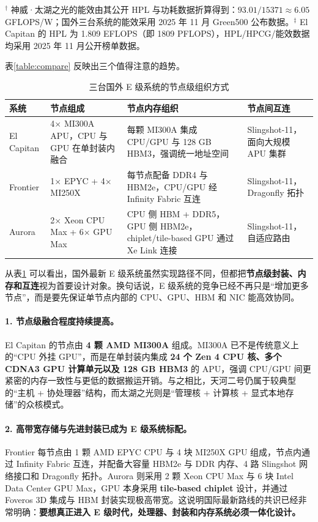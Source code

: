 \documentclass[a4paper]{article}
\begin{document}
\noindent\footnotesize{$^\dagger$ 神威·太湖之光的能效由其公开 HPL 与功耗数据折算得到：$93.01/15371 \approx 6.05$ GFLOPS/W；国外三台系统的能效采用 2025 年 11 月 Green500 公布数据。$^{\ddagger}$ El Capitan 的 HPL 为 1.809 EFLOPS（即 1809 PFLOPS），HPL/HPCG/能效数据均采用 2025 年 11 月公开榜单数据。}\normalsize

表\ref{table:compare} 反映出三个值得注意的趋势。

\begin{table}[htbp]
  \centering
  \footnotesize
  \begin{tabular}{p{1.8cm}p{3.7cm}p{3.4cm}p{3.2cm}}
  \toprule
  系统 & 节点组成 & 节点内存组织 & 节点间互连 \\
  \midrule
  El Capitan & 4$\times$ MI300A APU，CPU 与 GPU 在单封装内融合 & 每颗 MI300A 集成 CPU/GPU 与 128 GB HBM3，强调统一地址空间 & Slingshot-11，面向大规模 APU 集群 \\
  Frontier & 1$\times$ EPYC + 4$\times$ MI250X & 每节点配备 DDR4 与 HBM2e，CPU/GPU 经 Infinity Fabric 互连 & Slingshot-11，Dragonfly 拓扑 \\
  Aurora & 2$\times$ Xeon CPU Max + 6$\times$ GPU Max & CPU 侧 HBM + DDR5，GPU 侧 HBM2e，chiplet/tile-based GPU 通过 Xe Link 连接 & Slingshot-11，自适应路由 \\
  \bottomrule
  \end{tabular}
  \caption{三台国外 E 级系统的节点级组织方式}
  \label{table:foreign_nodes}
\end{table}

从表\ref{table:foreign_nodes} 可以看出，国外最新 E 级系统虽然实现路径不同，但都把\textbf{节点级封装、内存和互连}视为首要设计对象。换句话说，E 级系统的竞争已经不再只是“增加更多节点”，而是要先保证单节点内部的 CPU、GPU、HBM 和 NIC 能高效协同。

\paragraph{1. 节点级融合程度持续提高。}
El Capitan 的节点由 \textbf{4 颗 AMD MI300A} 组成。MI300A 已不是传统意义上的“CPU 外挂 GPU”，而是在单封装内集成 \textbf{24 个 Zen 4 CPU 核、多个 CDNA3 GPU 计算单元以及 128 GB HBM3} 的 APU，强调 CPU/GPU 间更紧密的内存一致性与更低的数据搬运开销\cite{elcapitan_hw_2025}。与之相比，天河二号仍属于较典型的“主机 + 协处理器”结构，而太湖之光则是“管理核 + 计算核 + 显式本地存储”的众核模式。

\paragraph{2. 高带宽存储与先进封装已成为 E 级系统标配。}
Frontier 每节点由 1 颗 AMD EPYC CPU 与 4 块 MI250X GPU 组成，节点内通过 Infinity Fabric 互连，并配备大容量 HBM2e 与 DDR 内存、4 路 Slingshot 网络接口和 Dragonfly 拓扑\cite{frontier_arch_2022}。Aurora 则采用 2 颗 Xeon CPU Max 与 6 块 Intel Data Center GPU Max，GPU 本身采用 \textbf{tile-based chiplet} 设计，并通过 Foveros 3D 集成与 HBM 封装实现极高带宽\cite{aurora_alcf_2025}。这说明国际最新路线的共识已经非常明确：\textbf{要想真正进入 E 级时代，处理器、封装和内存系统必须一体化设计。}
\end{document}
